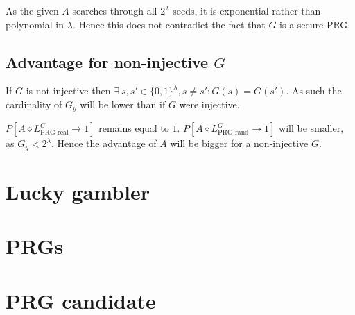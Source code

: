 \documentclass[a4paper]{scrreprt}
\begin{document}
As the given $A$ searches through all $2^\lambda$ seeds, it is exponential
rather than polynomial in $\lambda$. Hence this does not contradict the fact
that $G$ is a secure PRG.

\subsection{Advantage for non-injective $G$}

If $G$ is not injective then $\exists\ s, s' \in \{0, 1\}^\lambda, s \neq s':
G(s) = G(s')$. As such the cardinality of $G_y$ will be lower than if $G$ were
injective.

$P[A \diamond L^G_{\text{PRG-real}} \rightarrow 1]$ remains equal to $1$. $P[A
\diamond L^G_{\text{PRG-rand}} \rightarrow 1]$ will be smaller, as $G_y <
2^\lambda$. Hence the advantage of $A$ will be bigger for a non-injective $G$.

\section{Lucky gambler}


\section{PRGs}


\section{PRG candidate}
\end{document}
